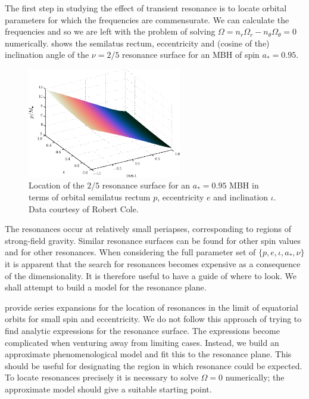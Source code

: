 The first step in studying the effect of transient resonance is to locate orbital parameters for which the frequencies are commensurate. We can calculate the frequencies and so we are left with the problem of solving $\Omega = n_r \Omega_r - n_\theta \Omega_\theta = 0$ numerically.  shows the semilatus rectum, eccentricity and (cosine of the) inclination angle of the $\nu = 2/5$ resonance surface for an MBH of spin $a_\ast = 0.95$. 
\begin{figure}%
\centering
\includegraphics[width=0.6\textwidth]{./images/Fig_res-2-5-95-plane}
\caption{Location of the $2/5$ resonance surface for an $a_\ast = 0.95$ MBH in terms of orbital semilatus rectum $p$, eccentricity $e$ and inclination $\iota$. Data courtesy of Robert Cole.}\label{fig:res-plane-2-5-95}
\end{figure}
The resonances occur at relatively small periapses, corresponding to regions of strong-field gravity.
Similar resonance surfaces can be found for other spin values and for other resonances. When considering the full parameter set of $\{p,e,\iota,a_\ast,\nu\}$ it is apparent that the search for resonances becomes expensive as a consequence of the dimensionality. It is therefore useful to have a guide of where to look. We shall attempt to build a model for the resonance plane.

\citet{Brink2013} provide series expansions for the location of resonances in the limit of equatorial orbits for small spin and eccentricity. We do not follow this approach of trying to find analytic expressions for the resonance surface. The expressions become complicated when venturing away from limiting cases. Instead, we build an approximate phenomenological model and fit this to the resonance plane. %
This should be useful for designating the region in which resonance could be expected. To locate resonances precisely it is necessary to solve $\Omega = 0$ numerically; the approximate model should give a suitable starting point.

